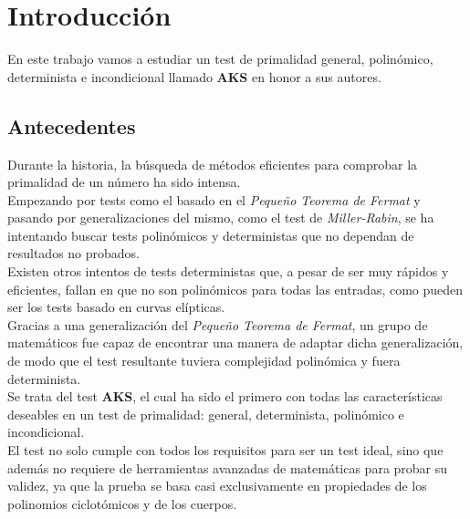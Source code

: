 %


\chapter{Introducción}

En este trabajo vamos a estudiar un test de primalidad general, polinómico, determinista e incondicional llamado \textbf{AKS} en honor a sus autores.

\section{Antecedentes}

Durante la historia, la búsqueda de métodos eficientes para comprobar la primalidad de un número ha sido intensa.\\

Empezando por tests como el basado en el \textit{Pequeño Teorema de Fermat} y pasando por generalizaciones del mismo, como el test de \textit{Miller-Rabin}, se ha intentando buscar tests polinómicos y deterministas que no dependan de resultados no probados.\\

Existen otros intentos de tests deterministas que, a pesar de ser muy rápidos y eficientes, fallan en que no son polinómicos para todas las entradas, como pueden ser los tests basado en curvas elípticas.\\

Gracias a una generalización del \textit{Pequeño Teorema de Fermat}, un grupo de matemáticos fue capaz de encontrar una manera de adaptar dicha generalización, de modo que el test resultante tuviera complejidad polinómica y fuera determinista.\\

Se trata del test \textbf{AKS}, el cual ha sido el primero con todas las características deseables en un test de primalidad: general, determinista, polinómico e incondicional.\\

El test no solo cumple con todos los requisitos para ser un test ideal, sino que además no requiere de herramientas avanzadas de matemáticas para probar su validez, ya que la prueba se basa casi exclusivamente en propiedades de los polinomios ciclotómicos y de los cuerpos.\\

